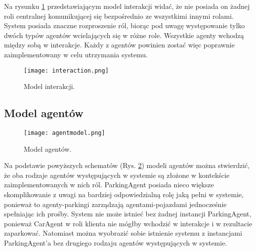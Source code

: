 Na rysunku \ref{fig:interaction} przedstawiającym model interakcji widać, że nie posiada on żadnej roli centralnej komunikującej się bezpośrednio ze wszystkimi innymi rolami. System posiada znaczne rozproszenie ról, biorąc pod uwagę występowanie tylko dwóch typów agentów wcielających się w różne role. Wszystkie agenty wchodzą między sobą w interakcje. Każdy z agentów powinien zostać więc poprawnie zaimplementowany w celu utrzymania systemu.

\begin{figure}[h!]
    \centering \texttt{[image: interaction.png]}
    \caption{Model interakcji.}
    \label{fig:interaction}
\end{figure}




\newpage
\subsection{Model agentów}

\begin{figure}[h!]
    \centering \texttt{[image: agentmodel.png]}
    \caption{Model agentów.}
    \label{fig:agentmodel}
\end{figure}

Na podstawie powyższych schematów (Rys. \ref{fig:agentmodel}) modeli agentów można stwierdzić, że oba rodzaje agentów  występujących w systemie są złożone w kontekście zaimplementowanych w nich ról. ParkingAgent posiada nieco większe skomplikowanie z uwagi na bardziej odpowiedzialną rolę jaką pełni w systemie, ponieważ to agenty-parkingi zarządzają agentami-pojazdami jednocześnie spełniając ich prośby. System nie może istnieć bez żadnej instancji ParkingAgent, ponieważ CarAgent w roli klienta nie mógłby wchodzić w interakcje i w rezultacie zaparkować. Natomiast można wyobrazić sobie istnienie systemu z instancjami ParkingAgent’a bez drugiego rodzaju agentów występujących w systemie.

\newpage

